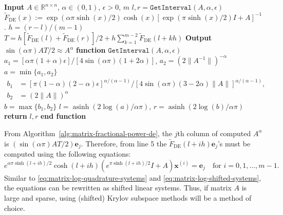 \begin{algorithm}[H]\caption{{$m$-point DE formula for computing $A^\alpha$}}\label{alg:matrix-fractional-power-de}\begin{algorithmic}[1]
\State \textbf{Input} $A\in\mathbb{R}^{n\times n}$, $\alpha\in(0,1)$, $\epsilon>0$, $m$
\State $l,r=\mathtt{GetInterval}(A,\alpha,\epsilon)$
 $\widetilde{F}_{\mathrm{DE}}(x):=\exp(\alpha\pi\sinh(x)/2)\cosh(x)[\exp(\pi\sinh(x)/2)I+A]^{-1}$.
\State $h=(r-l)/(m-1)$
\State $T=h[\widetilde{F}_{\mathrm{DE}}(l)+\widetilde{F}_{\mathrm{DE}}(r)]/2+h\sum_{k=1}^{m-2}\widetilde{F}_{\mathrm{DE}}(l+kh)$
\State \textbf{Output} $\sin(\alpha\pi)AT/2\approx A^\alpha$
\State{}
\State \textbf{function} $\mathtt{GetInterval}(A,\alpha,\epsilon)$
\State $a_1=[\alpha\pi(1+\alpha)\epsilon]/[4\sin(\alpha\pi)(1+2\alpha)]$, $a_2=(2\|A^{-1}\|)^{-\alpha}$
\State $a=\min\{a_1,a_2\}$
\State $\begin{aligned}b_1&=[\pi(1-\alpha)(2-\alpha)\epsilon]^{\alpha/(\alpha-1)}/[4\sin(\alpha\pi)(3-2\alpha)\|A\|]^{\alpha/(\alpha-1)},\\b_2&=(2\|A\|)^\alpha\end{aligned}$
\State $b=\max\{b_1,b_2\}$
\State $l=\operatorname{asinh}(2\log(a)/\alpha\pi)$, $r=\operatorname{asinh}(2\log(b)/\alpha\pi)$
\State \textbf{return} $l,r$
\State \textbf{end function}
\end{algorithmic}\end{algorithm}

{From Algorithm~\ref{alg:matrix-fractional-power-de}, the $j$th column of computed $A^\alpha$ is $(\sin(\alpha\pi)AT/2)\boldsymbol{e}_j$. Therefore, from line 5 the $\widetilde{F}_{\mathrm{DE}}(l+ih)\boldsymbol{e}_j$'s must be computed using the following equations:}
\[e^{\alpha\pi\sinh(l+ih)/2}\cosh(l+ih)(e^{\pi\sinh(l+ih)/2}I+A)\boldsymbol{x}^{(i)}=\boldsymbol{e}_j\quad\text{for }i=0,1,\ldots,m-1.\]
{Similar to \eqref{eq:matrix-log-quadrature-systems} and \eqref{eq:matrix-log-shifted-systems}, the equations can be rewritten as shifted linear systems. Thus, if matrix $A$ is large and sparse, using (shifted) Krylov subspace methods will be a method of choice.}
